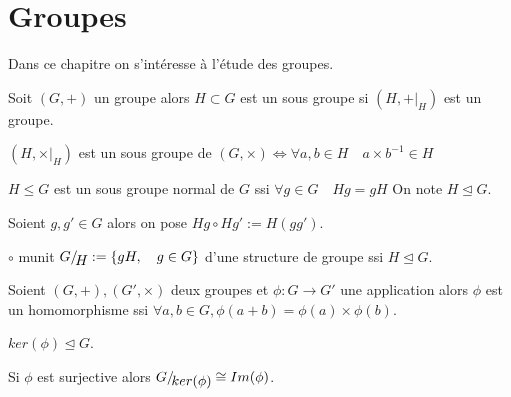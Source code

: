 \chapter{Groupes}
\label{cha:groupes}

Dans ce chapitre on s'intéresse à l'étude des groupes.

 \begin{definition}
    \label{def:49}
    Soit $(G,+)$ un groupe alors $H\subset G$ est un sous groupe si $(H,+|_{ H })$ est un groupe.
 \end{definition}
 
 \begin{lemma}
    \label{lem:23}
    $(H,\times|_H)$ est un sous groupe de $(G,\times) \Leftrightarrow \forall a,b \in H\quad a\times b^{-1} \in H$
   \end{lemma}
   
    \begin{definition}
    \label{def:49}
    $H\le G$ est un sous groupe normal de $G$ ssi $\forall g \in G\quad Hg=gH$ On note $H\unlhd G$.
     \end{definition}
     
      \begin{definition}
    \label{def:49}
    Soient $g,g' \in G$ alors on pose $Hg \circ Hg' := H(gg')$.
     \end{definition}
     
     \begin{theorem}
    \label{thr:28}
    $\circ$  munit $G/\!\raisebox{-.65ex}{\ensuremath{{H}}}  := \left\{ gH,\quad g\in G \right\}$ d'une structure de groupe ssi $H\unlhd G$.
    \end{theorem}
    
       \begin{definition}
    \label{def:49}
    Soient $(G,+),(G',\times)$ deux groupes et $\phi :G\rightarrow G'$ une application alors $\phi$ est un homomorphisme ssi 
    $\forall a,b \in G, \phi(a+b)=\phi(a) \times \phi(b)$.
    \end{definition}
    
    \begin{remark}
    $ker(\phi) \unlhd G$.
    \end{remark}
    
     \begin{theorem}
    \label{thr:28}
    Si $\phi$ est surjective alors $G/\!\raisebox{-.65ex}{\ensuremath{{ker(\phi)}}} \cong Im(\phi)$.
     \end{theorem}
     
